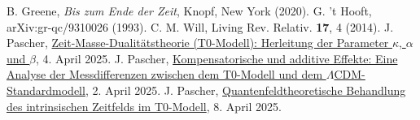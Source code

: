 \documentclass[12pt,a4paper]{article}
\begin{document}
\begin{thebibliography}{99}
		 B. Greene, \textit{Bis zum Ende der Zeit}, Knopf, New York (2020).
		 G. 't Hooft, arXiv:gr-qc/9310026 (1993).
		 C. M. Will, Living Rev. Relativ. \textbf{17}, 4 (2014).
		 J. Pascher, \href{https://github.com/jpascher/T0-Time-Mass-Duality/tree/main/2/pdf/Deutsch/ZeitMasseT0Params.pdf}{Zeit-Masse-Dualitätstheorie (T0-Modell): Herleitung der Parameter \(\kappa\), \(\alpha\) und \(\beta\)}, 4. April 2025.
		 J. Pascher, \href{https://github.com/jpascher/T0-Time-Mass-Duality/tree/main/2/pdf/Deutsch/MessdifferenzenT0Standard.pdf}{Kompensatorische und additive Effekte: Eine Analyse der Messdifferenzen zwischen dem T0-Modell und dem \(\Lambda\)CDM-Standardmodell}, 2. April 2025.
		 J. Pascher, \href{https://github.com/jpascher/T0-Time-Mass-Duality/tree/main/2/pdf/Deutsch/QFTIntrinsischesZeitT0.pdf}{Quantenfeldtheoretische Behandlung des intrinsischen Zeitfelds im T0-Modell}, 8. April 2025.
	\end{thebibliography}
	
\end{document}
